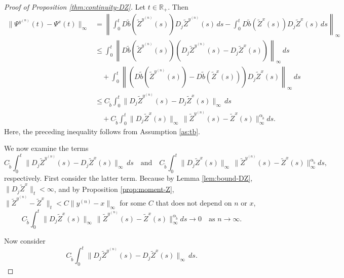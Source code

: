 \documentclass[11pt]{article}
\theoremstyle{definition}
\theoremstyle{plain}
\newcommand{\tb}{\tilde{b}}
\begin{document}
\begin{appendices}
\begin{proof}[Proof of Proposition \ref{thm:continuity-DZ}]
  Let \( t \in \mathbb{R}_+ \). Then
  \begin{align*}
  \| \Psi^{y^{(n)}}(t) - \Psi^x(t) \|_\infty
  &= \left\| \int_0^t D\tb(\tilde{Z}^{y^{(n)}}(s)) D_j\tilde{Z}^{y^{(n)}}(s)\,ds - \int_0^t D\tb(\tilde{Z}^x(s)) D_j\tilde{Z}^x(s)\,ds \right\|_\infty \\
  &\le \int_0^t \left\| D\tb(\tilde{Z}^{y^{(n)}}(s)) \left(D_j\tilde{Z}^{y^{(n)}}(s) - D_j\tilde{Z}^x(s)\right) \right\|_\infty \,ds \\
  &\quad + \int_0^t \left\| \left(D\tb(\tilde{Z}^{y^{(n)}}(s)) - D\tb(\tilde{Z}^x(s))\right)D_j\tilde{Z}^x(s) \right\|_\infty \,ds \\
  &\le C_{\tb} \int_0^t \| D_j\tilde{Z}^{y^{(n)}}(s) - D_j\tilde{Z}^x(s) \|_\infty\,ds \\
  &\quad + C_{\tb} \int_0^t \|D_j \tilde{Z}^x(s)\|_\infty \, \|\tilde{Z}^{y^{(n)}}(s) - \tilde{Z}^x(s)\|_\infty^{\alpha_{\tb}} ds.
  \end{align*}
  Here, the preceding inequality follows from Assumption \ref{as:tb}.
  
  We now examine the terms
  \[
  C_{\tb} \int_0^t \| D_j\tilde{Z}^{y^{(n)}}(s) - D_j\tilde{Z}^x(s) \|_\infty \,ds \quad \text{and} \quad
  C_{\tb} \int_0^t \|D_j \tilde{Z}^x(s)\|_\infty \, \|\tilde{Z}^{y^{(n)}}(s) - \tilde{Z}^x(s)\|_\infty^{\alpha_{\tb}} ds, 
  \]
  respectively. First consider the latter term. Because by Lemma \ref{lem:bound-DZ}, \( \|D_j \tilde{Z}^x\|_t < \infty \), 
  and by Proposition \ref{prop:moment-Z}, 
  \( \|\tilde{Z}^{y^{(n)}} - \tilde{Z}^x\|_t < C \|y^{(n)}-x\|_\infty \) for some $C$ that does not depend on $n$ or $x$, %
  \[
  C_{\tb} \int_0^t \|D_j \tilde{Z}^x(s)\|_\infty \, \|\tilde{Z}^{y^{(n)}}(s) - \tilde{Z}^x(s)\|_\infty^{\alpha_{\tb}} ds \to 0 
  \quad \text{as } n \to \infty.
  \]
  
  Now consider
  \[
  C_{\tb}\int_0^t \| D_j\tilde{Z}^{y^{(n)}}(s) - D_j\tilde{Z}^x(s) \|_\infty\,ds.
  \]
  

\end{proof}
\end{appendices}
\end{document}
